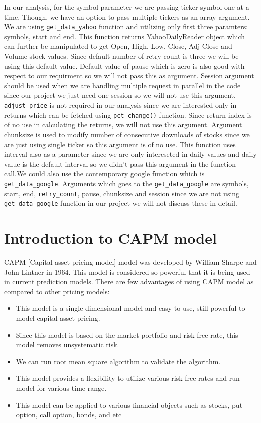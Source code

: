 \indent 
In our analysis, for the symbol parameter we are passing ticker symbol one at a time. Though, we have an option to pass multiple tickers as an array argument. 
We are using \texttt{get\_data\_yahoo} function and utilizing only
first three paramters: symbols, start and end.  This function returns YahooDailyReader object which can further be manipulated to get Open, High, Low, Close, Adj Close
and Volume stock values. Since default number of retry count is three we will be using this default value. Default value of pause which is zero is also good with
respect to our requirment so we will not pass this as argument. Session argument should be used when we are handling multiple request in parallel  in the code
since our project we just need one session so we will not use this argument. \texttt{adjust\_price} is not required in our analysis since we are interested only in returns
which can be fetched using \texttt{pct\_change()} function. Since return index is of no use in calculating the returns, we will not use this argument.
Argument chunksize is used to modify number of consecutive downloads of stocks since we are just using single ticker so this argument is of no use.
This function uses interval also as a parameter since we are only intereseted in daily values and daily value is the default 
interval so we didn't pass this argument in the function call.We could also use the contemporary google function which is \texttt{get\_data\_google}.
Arguments which goes to the \texttt{get\_data\_google} are symbols, start, end, \texttt{retry\_count}, pause, chunksize and session since we are not using 
\texttt{get\_data\_google} function in our project we will not discuss these in detail. 

\section{Introduction to CAPM model}

CAPM [Capital asset pricing model] model was developed by William Sharpe and John Lintner in 1964. This model is considered so powerful that it is being used in current 
prediction models. There are few advantages of using CAPM model as compared to other pricing models:

\begin{itemize}
\item This model is a single dimensional model and easy to use, still powerful to model capital asset pricing. 
\item Since this model is based on the market portfolio and risk free rate, this model removes unsystematic risk.  
\item We can run root mean square algorithm to validate the algorithm.
\item This model provides a flexibility to utilize various risk free rates and run model for various time range. 
\item This model can be applied to various financial objects such as stocks, put option, call option, bonds, and etc

\end{itemize}

